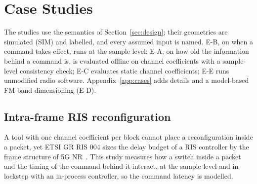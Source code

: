 \section{Case Studies}\label{sec:cases}

The studies use the semantics of Section~\ref{sec:design}; their geometries are simulated
(SIM) and labelled, and every assumed input is named. E-B, on when a command takes effect,
runs at the sample level; E-A, on how old the information behind a command is, is evaluated
offline on channel coefficients with a sample-level consistency check; E-C evaluates static
channel coefficients; E-E runs unmodified radio software. Appendix~\ref{app:cases} adds
details and a model-based FM-band dimensioning (E-D).

\subsection{Intra-frame RIS reconfiguration}\label{sec:cases-eb}
A tool with one channel coefficient per block cannot place a reconfiguration
inside a packet, yet ETSI GR RIS 004 sizes the delay budget of a RIS controller by the frame
structure of 5G NR~\cite{ETSI_GR_RIS004}. This study measures how a switch inside a packet and
the timing of the command behind it interact, at the sample level and in lockstep with an
in-process controller, so the command latency is modelled.

